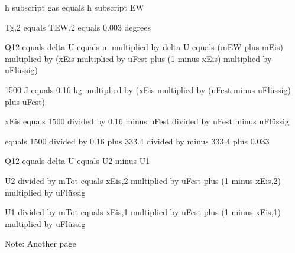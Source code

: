 h subscript gas equals h subscript EW

Tg,2 equals TEW,2 equals 0.003 degrees

Q12 equals delta U equals m multiplied by delta U equals (mEW plus mEis) multiplied by (xEis multiplied by uFest plus (1 minus xEis) multiplied by uFlüssig)

1500 J equals 0.16 kg multiplied by (xEis multiplied by (uFest minus uFlüssig) plus uFest)

xEis equals 1500 divided by 0.16 minus uFest divided by uFest minus uFlüssig

equals 1500 divided by 0.16 plus 333.4 divided by minus 333.4 plus 0.033

Q12 equals delta U equals U2 minus U1

U2 divided by mTot equals xEis,2 multiplied by uFest plus (1 minus xEis,2) multiplied by uFlüssig

U1 divided by mTot equals xEis,1 multiplied by uFest plus (1 minus xEis,1) multiplied by uFlüssig

Note: Another page